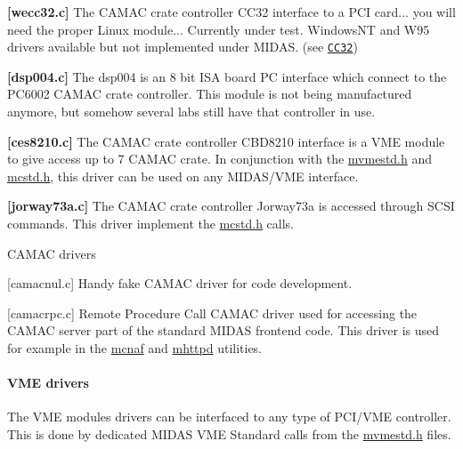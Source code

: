 \begin{DoxyItemize}
\begin{DoxyItemize}
\item {\bfseries \mbox{[}wecc32.c\mbox{]}} The CAMAC crate controller CC32 interface to a PCI card... you will need the proper Linux module... Currently under test. WindowsNT and W95 drivers available but not implemented under MIDAS. (see \href{http://www.wiener-d.com/cc32.htm}{\tt CC32})
\item {\bfseries \mbox{[}dsp004.c\mbox{]}} The dsp004 is an 8 bit ISA board PC interface which connect to the PC6002 CAMAC crate controller. This module is not being manufactured anymore, but somehow several labs still have that controller in use.
\item {\bfseries \mbox{[}ces8210.c\mbox{]}} The CAMAC crate controller CBD8210 interface is a VME module to give access up to 7 CAMAC crate. In conjunction with the \hyperlink{mvmestd_8h}{mvmestd.h} and \hyperlink{mcstd_8h}{mcstd.h}, this driver can be used on any MIDAS/VME interface.
\item {\bfseries \mbox{[}jorway73a.c\mbox{]}} The CAMAC crate controller Jorway73a is accessed through SCSI commands. This driver implement the \hyperlink{mcstd_8h}{mcstd.h} calls.
\end{DoxyItemize}
\end{DoxyItemize}


\begin{DoxyItemize}
\item CAMAC drivers
\begin{DoxyItemize}
\item {\bfseries }\mbox{[}camacnul.c\mbox{]} Handy fake CAMAC driver for code development.
\item {\bfseries }\mbox{[}camacrpc.c\mbox{]} Remote Procedure Call CAMAC driver used for accessing the CAMAC server part of the standard MIDAS frontend code. This driver is used for example in the \hyperlink{FE_utils_FE_mcnaf_utility}{mcnaf} and \hyperlink{RC_mhttpd_utility}{mhttpd} utilities.
\end{DoxyItemize}
\end{DoxyItemize}

\label{FE_Hardware_idx_Hardware_drivers_VME}
\hypertarget{FE_Hardware_idx_Hardware_drivers_VME}{}
 

 \hypertarget{FE_Hardware_VME_drivers}{}\paragraph{VME drivers}\label{FE_Hardware_VME_drivers}
The VME modules drivers can be interfaced to any type of PCI/VME controller. This is done by dedicated MIDAS VME Standard calls from the \hyperlink{mvmestd_8h}{mvmestd.h} files.


